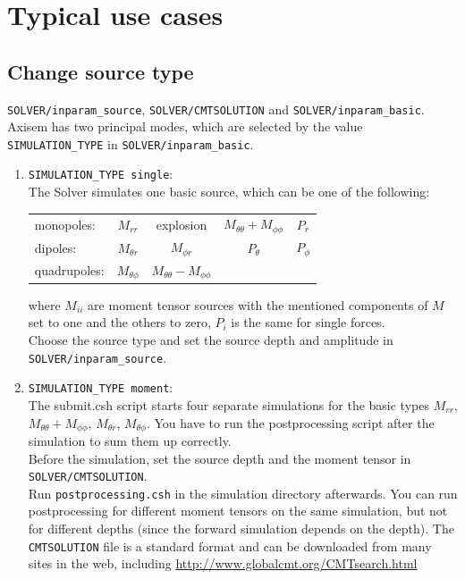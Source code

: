 \documentclass{article}
\begin{document}
\section{Typical use cases}
\subsection{Change source type}
\verb|SOLVER/inparam_source|, \verb|SOLVER/CMTSOLUTION| and \verb|SOLVER/inparam_basic|.
Axisem has two principal modes, which are selected by the value \verb|SIMULATION_TYPE| in \verb|SOLVER/inparam_basic|.
\begin{enumerate}
 \item \verb|SIMULATION_TYPE single|:\\ The Solver simulates one basic source, which can be one of the following:\\
\begin{center}
\begin{tabular}{|l|cccc|} \hline
 monopoles:   & $M_{rr}$ & explosion  & $M_{\theta\theta}+M_{\phi\phi}$  & $P_r$ \\
 dipoles:     & $M_{\theta r}$ & $M_{\phi r}$        & $P_{\theta}$ & $P_{\phi}$\\
 quadrupoles: & $M_{\theta \phi}$ & $M_{\theta\theta}-M_{\phi\phi}$ & & \\\hline
\end{tabular}
\end{center}
where $M_{ii}$ are moment tensor sources with the mentioned components of $M$ set to one and the others to zero, $P_i$ is the same for single forces.\\
Choose the source type and set the source depth and amplitude in \verb|SOLVER/inparam_source|.
 \item \verb|SIMULATION_TYPE moment|:\\
 The submit.csh script starts four separate simulations for the basic types $M_{rr}$, $M_{\theta\theta}+M_{\phi\phi}$, $M_{\theta r}$, $M_{\theta \phi}$. You have to run the postprocessing script after the simulation to sum them up correctly. \\
 Before the simulation, set the source depth and the moment tensor in \verb|SOLVER/CMTSOLUTION|. \\Run \verb|postprocessing.csh| in the simulation directory afterwards. You can run postprocessing for different moment tensors on the same simulation, but not for different depths (since the forward simulation depends on the depth).
 The \verb|CMTSOLUTION| file is a standard format and can be downloaded from many sites in the web, including \url{http://www.globalcmt.org/CMTsearch.html}
\end{enumerate}
\end{document}
